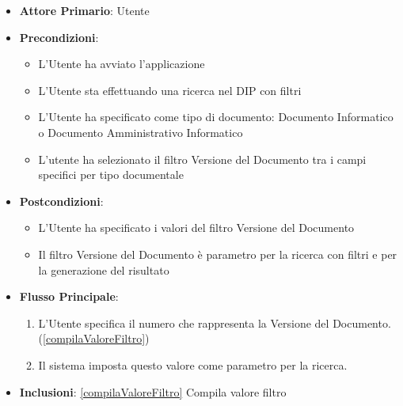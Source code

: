 \begin{itemize}
      \item \textbf{Attore Primario}: Utente
      \item \textbf{Precondizioni}: 
      \begin{itemize}
            \item L'Utente ha avviato l'applicazione
            \item L'Utente sta effettuando una ricerca nel DIP con filtri
            \item L'Utente ha specificato come tipo di documento: Documento Informatico o Documento Amministrativo Informatico
            \item L'utente ha selezionato il filtro Versione del Documento tra i campi specifici per tipo documentale
      \end{itemize}
      \item \textbf{Postcondizioni}: \begin{itemize}
            \item L'Utente ha specificato i valori del filtro Versione del Documento
            \item Il filtro Versione del Documento è parametro per la ricerca con filtri e per la generazione del risultato
      \end{itemize}
      \item \textbf{Flusso Principale}:
            \begin{enumerate}
                  \item L'Utente specifica il numero che rappresenta la Versione del Documento. (\ref{compilaValoreFiltro})
                  \item Il sistema imposta questo valore come parametro per la ricerca.
            \end{enumerate}
      \item \textbf{Inclusioni}: \ref{compilaValoreFiltro} Compila valore filtro
\end{itemize}


